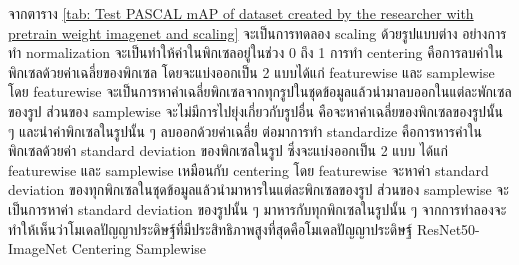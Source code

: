 จากตาราง \ref{tab: Test PASCAL mAP of dataset created by the researcher with pretrain weight imagenet and scaling} จะเป็นการทดลอง scaling ด้วยรูปแบบต่าง อย่างการทำ normalization จะเป็นทำให้ค่าในพิกเซลอยู่ในช่วง 0 ถึง 1 การทำ centering คือการลบค่าในพิกเซลด้วยค่าเฉลี่ยของพิกเซล โดยจะแบ่งออกเป็น 2 แบบได้แก่ featurewise และ samplewise โดย featurewise จะเป็นการหาค่าเฉลี่ยพิกเซลจากทุกรูปในชุดข้อมูลแล้วนำมาลบออกในแต่ละพักเซลของรูป ส่วนของ samplewise จะไม่มีการไปยุ่งเกี่ยวกับรูปอื่น คือจะหาค่าเฉลี่ยของพิกเซลของรูปนั้น ๆ และนำค่าพิกเซลในรูปนั้น ๆ ลบออกด้วยค่าเฉลี่ย ต่อมาการทำ standardize คือการหารค่าในพิกเซลด้วยค่า standard deviation ของพิกเซลในรูป ซึ่งจะแบ่งออกเป็น 2 แบบ ได้แก่ featurewise และ samplewise เหมือนกับ centering โดย featurewise จะหาค่า standard deviation ของทุกพิกเซลในชุดข้อมูลแล้วนำมาหารในแต่ละพิกเซลของรูป ส่วนของ samplewise จะเป็นการหาค่า standard deviation ของรูปนั้น ๆ มาหารกับทุกพิกเซลในรูปนั้น ๆ จากการทำลองจะทำให้เห็นว่าโมเดลปัญญาประดิษฐ์ที่มีประสิทธิภาพสูงที่สุดคือโมเดลปัญญาประดิษฐ์ ResNet50-ImageNet	 Centering Samplewise


